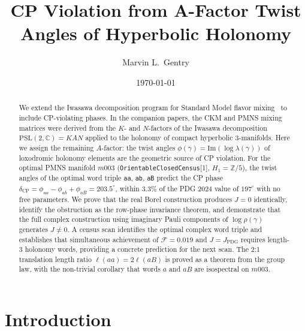 \documentclass[floatfix,aps,prd,twocolumn,showpacs,superscriptaddress,longbibliography]{revtex4-2}
\newcommand{\PSL}{\mathrm{PSL}(2,\mathbb{C})}
\begin{document}
\title{CP Violation from A-Factor Twist Angles of Hyperbolic Holonomy}

\author{Marvin L.~Gentry}

\date{\today}

\begin{abstract}
We extend the Iwasawa decomposition program for Standard Model flavor
mixing~\cite{Gentry:CKM,Gentry:PMNS} to include CP-violating phases.
In the companion papers, the CKM and PMNS mixing matrices were derived
from the $K$- and $N$-factors of the Iwasawa decomposition
$\PSL = KAN$ applied to the holonomy of compact hyperbolic 3-manifolds.
Here we assign the remaining $A$-factor: the twist angles
$\phi(\gamma) = \mathrm{Im}(\log\lambda(\gamma))$ of loxodromic holonomy
elements are the geometric source of CP violation.
For the optimal PMNS manifold $m003$
(\texttt{OrientableClosedCensus}[1], $H_1 = \mathbb{Z}/5$),
the twist angles of the optimal word triple \texttt{aa}, \texttt{ab},
\texttt{aB} predict the CP phase
$\delta_{\mathrm{CP}} = \phi_{aa} - \phi_{ab} + \phi_{aB} = 203.5^\circ$,
within $3.3\%$ of the PDG 2024 value of $197^\circ$ with no free parameters.
We prove that the real Borel construction produces $J = 0$ identically,
identify the obstruction as the row-phase invariance theorem,
and demonstrate that the full complex construction using imaginary
Pauli components of $\log\rho(\gamma)$ generates $J \neq 0$.
A census scan identifies the optimal complex word triple and
establishes that simultaneous achievement of $\mathcal{F} = 0.019$
and $J = J_{\mathrm{PDG}}$ requires length-3 holonomy words,
providing a concrete prediction for the next scan.
The 2:1 translation length ratio $\ell(aa) = 2\ell(aB)$ is proved
as a theorem from the group law, with the non-trivial corollary
that words $a$ and $aB$ are isospectral on $m003$.
\end{abstract}


\maketitle

\section{Introduction}
\label{sec:intro}
\end{document}
